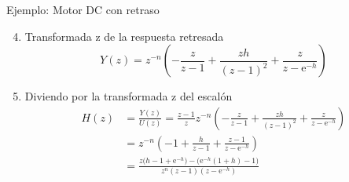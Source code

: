 \documentclass[presentation,aspectratio=169]{beamer}
\begin{document}
\begin{frame}[label={sec:orgf264819}]{Ejemplo: Motor DC con retraso}
\begin{enumerate}
\setcounter{enumi}{3}
\item \alert{Transformada z de la respuesta retresada}
\[ Y(z) = z^{-n} \left(-\frac{z}{z-1} + \frac{zh}{(z-1)^2} + \frac{z}{z-\mathrm{e}^{-h}}\right)\]
\item \alert{Diviendo por la transformada z del escalón} 
\begin{align*}
H(z) &= \frac{Y(z)}{U(z)} = \frac{z-1}{z} z^{-n} \left(-\frac{z}{z-1} + \frac{zh}{(z-1)^2} + \frac{z}{z-\mathrm{e}^{-h}}\right)\\
&= z^{-n} \left( -1 + \frac{h}{z-1} + \frac{z-1}{z-\mathrm{e}^{-h}} \right)\\
&= \frac{ z\big( h-1+\mathrm{e}^{-h}\big) - \big(\mathrm{e}^{-h}(1+h) - 1\big)}{z^n(z-1)(z-\mathrm{e}^{-h})}
\end{align*}
\end{enumerate}
\end{frame}
\end{document}
